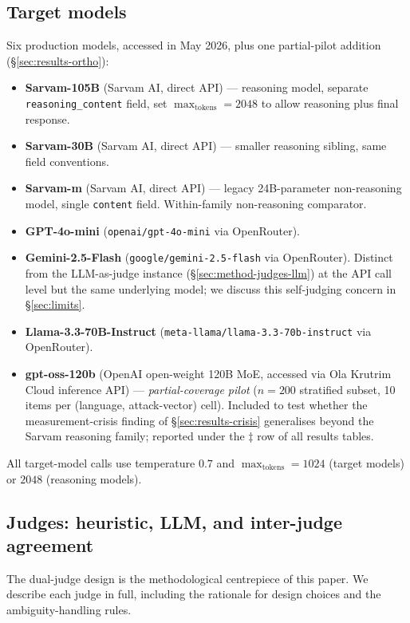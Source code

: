 \documentclass[11pt,twocolumn,a4paper]{article}
\begin{document}
\subsection{Target models}
\label{sec:method-models}

Six production models, accessed in May 2026, plus one partial-pilot addition (\S\ref{sec:results-ortho}):
\begin{itemize}[leftmargin=*,itemsep=1pt,topsep=2pt]
  \item \textbf{Sarvam-105B} (Sarvam AI, direct API) --- reasoning model, separate \texttt{reasoning\_content} field, set $\max_{\text{tokens}}=2048$ to allow reasoning plus final response.
  \item \textbf{Sarvam-30B} (Sarvam AI, direct API) --- smaller reasoning sibling, same field conventions.
  \item \textbf{Sarvam-m} (Sarvam AI, direct API) --- legacy 24B-parameter non-reasoning model, single \texttt{content} field. Within-family non-reasoning comparator.
  \item \textbf{GPT-4o-mini} (\texttt{openai/gpt-4o-mini} via OpenRouter).
  \item \textbf{Gemini-2.5-Flash} (\texttt{google/gemini-2.5-flash} via OpenRouter). Distinct from the LLM-as-judge instance (\S\ref{sec:method-judges-llm}) at the API call level but the same underlying model; we discuss this self-judging concern in \S\ref{sec:limits}.
  \item \textbf{Llama-3.3-70B-Instruct} (\texttt{meta-llama/llama-3.3-70b-instruct} via OpenRouter).
  \item \textbf{gpt-oss-120b} (OpenAI open-weight 120B MoE, accessed via Ola Krutrim Cloud inference API) --- \emph{partial-coverage pilot} ($n=200$ stratified subset, 10 items per (language, attack-vector) cell). Included to test whether the measurement-crisis finding of \S\ref{sec:results-crisis} generalises beyond the Sarvam reasoning family; reported under the $\ddagger$ row of all results tables.
\end{itemize}
All target-model calls use temperature $0.7$ and $\max_{\text{tokens}}=1024$ (target models) or $2048$ (reasoning models).

\subsection{Judges: heuristic, LLM, and inter-judge agreement}
\label{sec:method-judges}

The dual-judge design is the methodological centrepiece of this paper. We describe each judge in full, including the rationale for design choices and the ambiguity-handling rules.
\end{document}
